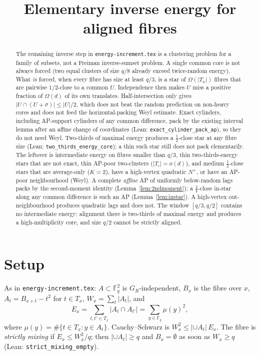 \documentclass[11pt]{article}
\title{Elementary inverse energy for aligned fibres}
\date{}
\theoremstyle{definition}
\newcommand{\F}{\mathbb{F}}
\begin{document}
\maketitle

\begin{abstract}
The remaining inverse step in \texttt{energy-increment.tex} is a clustering problem for a family of subsets, not a Freiman inverse-sumset problem.
A single common core is not always forced (two equal clusters of size $q/8$ already exceed twice-random energy).
What \emph{is} forced, when every fibre has size at least $q/3$, is a star of $\Omega(|T_x|)$ fibres that are pairwise $1/2$-close to a common $U$.
Independence then makes $U$ miss a positive fraction of $\Omega(d)$ of its own translates.
Half-intersection only gives $|U\cap(U+\sigma)|\le|U|/2$, which does not beat
the random prediction on non-heavy cores and does not feed the horizontal-packing Weyl estimate.
Exact cylinders, including AP-support cylinders of any common difference,
pack by the existing interval lemma after an affine change of
coordinates (Lean: \texttt{exact\_cylinder\_pack\_ap}), so they do not need Weyl.
Two-thirds of maximal energy produces a $\tfrac12$-close star at any fibre
size (Lean: \texttt{two\_thirds\_energy\_core}); a thin such star still does
not pack elementarily.
The leftover is intermediate energy on fibres smaller than $q/3$, thin
two-thirds-energy stars that are not exact, thin AP-poor two-clusters
($|T_i|=o(d)$), and medium $\tfrac12$-close stars that are average-only
($K=2$), have a high-vertex quadratic $N^+$, or have an AP-poor
neighbourhood (Weyl).
A complete \emph{affine} AP of uniformly below-random lags packs
by the second-moment identity (Lemma~\ref{lem:2ndmoment}); a
$\tfrac34$-close in-star along any common difference is such an AP
(Lemma~\ref{lem:instar}).
A high-vertex out-neighbourhood produces quadratic lags and does not.
The window $[q/3,q/2]$ contains no intermediate energy: alignment there
is two-thirds of maximal energy and produces a high-multiplicity core,
and size $q/2$ cannot be strictly aligned.
\end{abstract}

\section{Setup}

As in \texttt{energy-increment.tex}: $A\subset\F_q^{2}$ is $G_R$-independent, $B_x$ is the fibre over $x$, $A_t=B_{x+t}-t^{2}$ for $t\in T_x$, $W_x=\sum_t|A_t|$, and
\[
  E_x=\sum_{t,t'\in T_x}|A_t\cap A_{t'}|=\sum_{y\in\F_q}\mu(y)^{2},
\]
where $\mu(y)=\#\{t\in T_x:y\in A_t\}$.
Cauchy--Schwarz is $W_x^{2}\le|\cup A_t|\,E_x$.
The fibre is \emph{strictly mixing} if $E_x\le W_x^{2}/q$; then $|\cup A_t|\ge q$ and $B_x=\emptyset$ as soon as $W_x\ge q$ (Lean: \texttt{strict\_mixing\_empty}).
\end{document}
